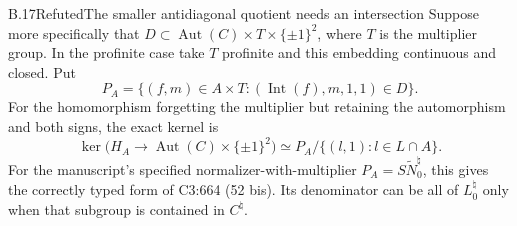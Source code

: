 \begin{statement}{B.17}{Refuted}{The smaller antidiagonal quotient needs an intersection}
Suppose more specifically that
\(D\subset\operatorname{Aut}(C)\times T\times\{\pm1\}^2\),
where \(T\) is the multiplier group.  In the profinite
case take \(T\) profinite and this embedding continuous
and closed.  Put
\[
 P_A=\{(f,m)\in A\times T:
             (\operatorname{Int}(f),m,1,1)\in D\}.
\]
For the homomorphism forgetting the multiplier but retaining
the automorphism and both signs, the exact kernel is
\[
 \ker\bigl(H_A\longrightarrow
       \operatorname{Aut}(C)\times\{\pm1\}^2\bigr)
 \simeq P_A/\{(l,1):l\in L\cap A\}.                 \tag{B.17.2}
\]
For the manuscript's specified normalizer-with-multiplier
\(P_A=S\widetilde N_0^\natural\), this gives the correctly
typed form of C3:664 (52 bis).  Its denominator can be all
of \(L_0^\natural\) only when that subgroup is contained
in \(C^\natural\).
\end{statement}

